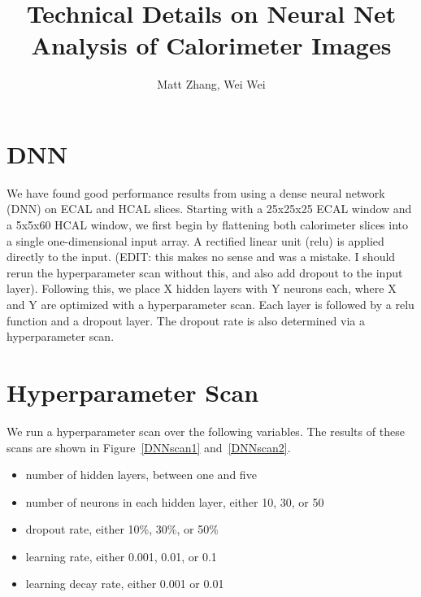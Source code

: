 \documentclass{article}
\begin{document}
    \title{Technical Details on Neural Net Analysis of Calorimeter Images}
    \author{Matt Zhang, Wei Wei}
    \date{}
    \maketitle

    \section*{DNN}

    We have found good performance results from using a dense neural network (DNN) on ECAL and HCAL slices. Starting with a 25x25x25 ECAL window and a 5x5x60 HCAL window, we first begin by flattening both calorimeter slices into a single one-dimensional input array. A rectified linear unit (relu) is applied directly to the input. (EDIT: this makes no sense and was a mistake. I should rerun the hyperparameter scan without this, and also add dropout to the input layer). Following this, we place X hidden layers with Y neurons each, where X and Y are optimized with a hyperparameter scan. Each layer is followed by a relu function and a dropout layer. The dropout rate is also determined via a hyperparameter scan.

    \section*{Hyperparameter Scan}

    We run a hyperparameter scan over the following variables. The results of these scans are shown in Figure~\ref{DNNscan1} and~\ref{DNNscan2}.
 
    \begin{itemize}
        \item number of hidden layers, between one and five
        \item number of neurons in each hidden layer, either 10, 30, or 50
        \item dropout rate, either 10\%, 30\%, or 50\%
        \item learning rate, either 0.001, 0.01, or 0.1
        \item learning decay rate, either 0.001 or 0.01
    \end{itemize}
\end{document}
